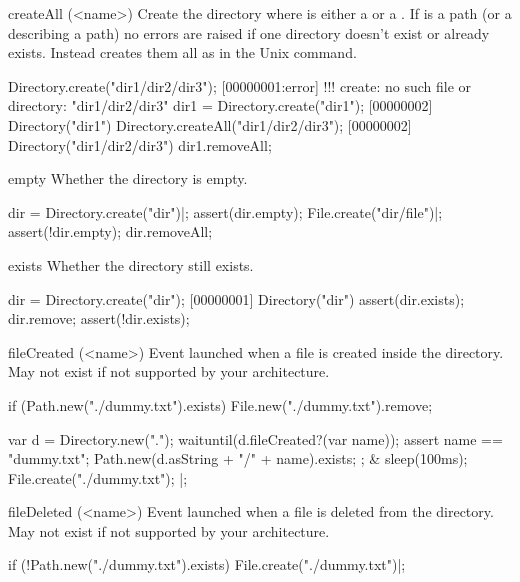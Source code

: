 \begin{urbiscriptapi}
\item[createAll](<name>)
  Create the directory  where  is either a
   or a . If  is a
  path (or a  describing a path) no errors are
  raised if one directory doesn't exist or already exists. Instead
   creates them all as in the Unix  command.
\begin{urbiscript}
Directory.create("dir1/dir2/dir3");
[00000001:error] !!! create: no such file or directory: "dir1/dir2/dir3"
dir1 = Directory.create("dir1");
[00000002] Directory("dir1")
Directory.createAll("dir1/dir2/dir3");
[00000002] Directory("dir1/dir2/dir3")
dir1.removeAll;
\end{urbiscript}


\item[empty]
  Whether the directory is empty.
\begin{urbiscript}
dir = Directory.create("dir")|;
assert(dir.empty);
File.create("dir/file")|;
assert(!dir.empty);
dir.removeAll;
\end{urbiscript}


\item[exists]
  Whether the directory still exists.
\begin{urbiscript}
dir = Directory.create("dir");
[00000001] Directory("dir")
assert(dir.exists);
dir.remove;
assert(!dir.exists);
\end{urbiscript}


\item[fileCreated](<name>)%
  Event launched when a file is created inside the directory.
  May not exist if not supported by your architecture.

\begin{urbiscript}[firstnumber=1]
if (Path.new("./dummy.txt").exists)
  File.new("./dummy.txt").remove;

  {
    var d = Directory.new(".");
    waituntil(d.fileCreated?(var name));
    assert
    {
      name == "dummy.txt";
      Path.new(d.asString + "/" + name).exists;
    };
  }
&
  {
    sleep(100ms);
    File.create("./dummy.txt");
  }|;
\end{urbiscript}


\item[fileDeleted](<name>)%
  Event launched when a file is deleted from the directory.  May not exist
  if not supported by your architecture.

\begin{urbiscript}
if (!Path.new("./dummy.txt").exists)
  File.create("./dummy.txt")|;


\end{urbiscript}
\end{urbiscriptapi}
